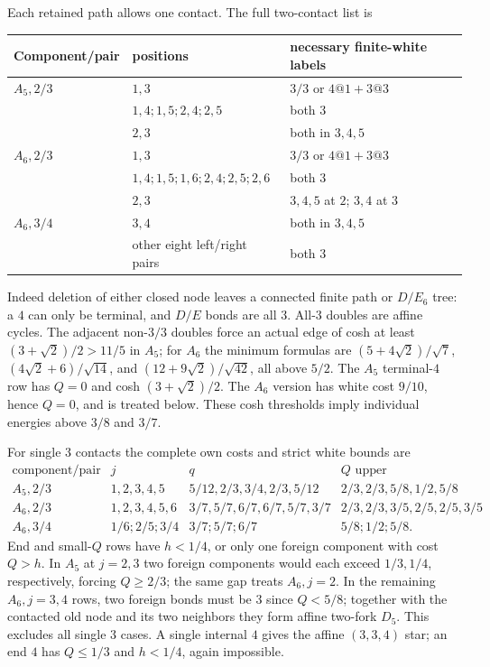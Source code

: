 \documentclass[11pt]{article}
\theoremstyle{remark}
\begin{document}
Each retained path allows one contact. The full two-contact list is
\begin{center}\small
\begin{tabular}{lll}
\toprule
Component/pair&positions&necessary finite-white labels\\ \midrule
$A_5,2/3$&$1,3$&$3/3$ or $4@1+3@3$\\
&$1,4;1,5;2,4;2,5$&both $3$\\
&$2,3$&both in $3,4,5$\\
$A_6,2/3$&$1,3$&$3/3$ or $4@1+3@3$\\
&$1,4;1,5;1,6;2,4;2,5;2,6$&both $3$\\
&$2,3$&$3,4,5$ at $2$; $3,4$ at $3$\\
$A_6,3/4$&$3,4$&both in $3,4,5$\\
&other eight left/right pairs&both $3$\\ \bottomrule
\end{tabular}\end{center}
Indeed deletion of either closed node leaves a connected finite
path or $D/E_6$ tree: a $4$ can only be terminal, and $D/E$ bonds
are all $3$. All-$3$ doubles are affine cycles. The adjacent
non-$3/3$ doubles force an actual edge of cosh at least
$(3+\sqrt2)/2>11/5$ in $A_5$; for $A_6$ the minimum formulas are
$(5+4\sqrt2)/\sqrt7$, $(4\sqrt2+6)/\sqrt{14}$, and
$(12+9\sqrt2)/\sqrt{42}$, all above $5/2$.
The $A_5$ terminal-$4$ row has $Q=0$ and cosh
$(3+\sqrt2)/2$. The $A_6$ version has white cost $9/10$, hence
$Q=0$, and is treated below. These cosh thresholds imply individual
energies above $3/8$ and $3/7$.

For single $3$ contacts the complete own costs and strict white
bounds are
\[
\begin{array}{c|c|c|c}
\text{component/pair}&j&q&Q\text{ upper}\\ \hline
A_5,2/3&1,2,3,4,5&5/12,2/3,3/4,2/3,5/12&2/3,2/3,5/8,1/2,5/8\\
A_6,2/3&1,2,3,4,5,6&3/7,5/7,6/7,6/7,5/7,3/7&2/3,2/3,3/5,2/5,2/5,3/5\\
A_6,3/4&1/6;2/5;3/4&3/7;5/7;6/7&5/8;1/2;5/8.
\end{array}
\]
End and small-$Q$ rows have $h<1/4$, or only one foreign
component with cost $Q>h$. In $A_5$ at $j=2,3$ two foreign
components would each exceed $1/3,1/4$, respectively, forcing
$Q\ge2/3$; the same gap treats $A_6,j=2$.
In the remaining $A_6,j=3,4$ rows, two foreign bonds must be $3$
since $Q<5/8$; together with the contacted old node and its two
neighbors they form affine two-fork $D_5$. This excludes all single
$3$ cases. A single internal $4$ gives the affine $(3,3,4)$ star;
an end $4$ has $Q\le1/3$ and $h<1/4$, again impossible.
\end{document}
